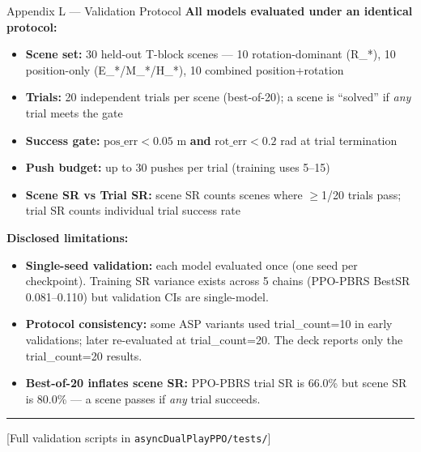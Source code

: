 \documentclass[aspectratio=169,xcolor=dvipsnames,t]{beamer}
\newcommand{\litfooter}[1]{%
  \vspace{2pt}%
  \hrule%
  \vspace{2pt}%
  {\tiny\color{LightDarkGrey} #1}%
}
\begin{document}
\begin{frame}[t]{Appendix L — Validation Protocol}
  \small
  \textbf{All models evaluated under an identical protocol:}

  \vspace{4pt}
  \begin{itemize}
    \item \textbf{Scene set:} 30 held-out T-block scenes — 10 rotation-dominant (R\_*), 10 position-only (E\_*/M\_*/H\_*), 10 combined position+rotation
    \item \textbf{Trials:} 20 independent trials per scene (best-of-20); a scene is ``solved'' if \emph{any} trial meets the gate
    \item \textbf{Success gate:} $\text{pos\_err} < 0.05$ m \textbf{and} $\text{rot\_err} < 0.2$ rad at trial termination
    \item \textbf{Push budget:} up to 30 pushes per trial (training uses 5--15)
    \item \textbf{Scene SR vs Trial SR:} scene SR counts scenes where $\ge$1/20 trials pass; trial SR counts individual trial success rate
  \end{itemize}

  \vspace{4pt}
  \textbf{Disclosed limitations:}
  \begin{itemize}
    \item \textbf{Single-seed validation:} each model evaluated once (one seed per checkpoint). Training SR variance exists across 5 chains (PPO-PBRS BestSR 0.081--0.110) but validation CIs are single-model.
    \item \textbf{Protocol consistency:} some ASP variants used trial\_count=10 in early validations; later re-evaluated at trial\_count=20. The deck reports only the trial\_count=20 results.
    \item \textbf{Best-of-20 inflates scene SR:} PPO-PBRS trial SR is 66.0\% but scene SR is 80.0\% — a scene passes if \emph{any} trial succeeds.
  \end{itemize}

  \vfill\litfooter{[Full validation scripts in \texttt{asyncDualPlayPPO/tests/}]}
\end{frame}
\end{document}
